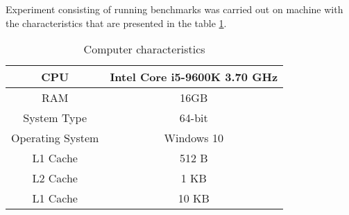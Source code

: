 Experiment consisting of running benchmarks was carried out on machine
with the characteristics that are presented in the table \ref{table:1}.
\begin{table}[h!]
    \centering
    \begin{tabular}{|c|c|}
        \hline
        CPU & Intel Core i5-9600K 3.70 GHz\\
        \hline
        RAM & 16GB \\
        \hline
        System Type & 64-bit\\
        \hline
        Operating System & Windows 10\\
        \hline
        L1 Cache & 512 B\\
        \hline
        L2 Cache & 1 KB\\
        \hline
        L1 Cache & 10 KB\\
        \hline
    \end{tabular}
    \caption{Computer characteristics}
    \label{table:1}
\end{table}
